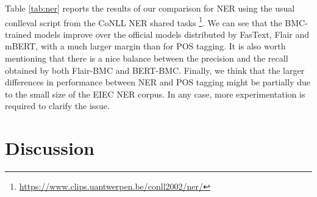 \documentclass[10pt, a4paper]{article}
\begin{document}
Table \ref{tab:ner} reports the results of our comparison for NER using the usual conlleval script from the CoNLL NER shared tasks \footnote{\scriptsize{\url{https://www.clips.uantwerpen.be/conll2002/ner/}}}. We can see that the BMC-trained models improve over the official models distributed by FasText, Flair and mBERT, with a much larger margin than for POS tagging. It is also worth mentioning that there is a nice balance between the precision and the recall obtained by both Flair-BMC and BERT-BMC. Finally, we think that the larger differences in performance between NER and POS tagging might be partially due to the small size of the EIEC NER corpus. In any case, more experimentation is required to clarify the issue.



\section{Discussion}\label{sec:discussion}
\end{document}
